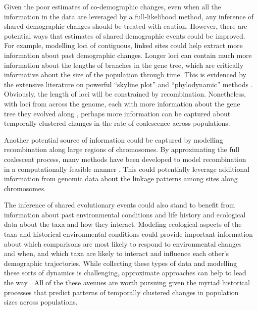Given the poor estimates of co-demographic changes, even when all the
information in the data are leveraged by a full-likelihood method, any
inference of shared demographic changes should be treated with caution.
However, there are potential ways that estimates of shared demographic
events could be improved.
For example, modelling loci of contiguous, linked sites could help
extract more information about past demographic changes.
Longer loci can contain much more information about the lengths of branches in
the gene tree, which are critically informative about the size of the
population through time.
This is evidenced by the extensive literature on powerful 
``skyline plot'' and ``phylodynamic'' methods
\citep{Pybus2000,Strimmer2001,OpgenRhein2005,Drummond2005,Heled2008,Minin2008beast,Ho2011,Palacios2012,Palacios2012UAI,Stadler2013,Gill2013,Palacios2014,Lan2015,Karcher2016,Karcher2017,Faulkner2018,Karcher2019}.
Obviously, the length of loci will be constrained by recombination.
Nonetheless, with loci from across the genome, each with more information about
the gene tree they evolved along \citep{Speidel2019},
perhaps more information can be captured about temporally clustered changes in
the rate of coalescence across populations.

Another potential source of information could be captured by modelling
recombination along large regions of chromosomes.
By approximating the full coalescent process, many methods have been developed
to model recombination in a computationally feasible manner
\citep{McVean2005,Marjoram2006,Chen2009,Li2011,Sheehan2013,Schiffels2014,Rasmussen2014,Palacios2015}.
This could potentially leverage additional information from genomic data about the
linkage patterns among sites along chromosomes.

The inference of shared evolutionary events could also stand to benefit from
information about past environmental conditions and life history and ecological
data about the taxa and how they interact.
Modeling ecological aspects of the taxa and historical environmental conditions
could provide important information about which comparisons are most likely to
respond to environmental changes and when, and which taxa are likely to
interact and influence each other's demographic trajectories.
While collecting these types of data and modelling these sorts of dynamics
is challenging, approximate approaches can help to lead the way
\citep{He2013,Massatti2016,Bemmels2016,Knowles2017,Papadopoulou2016}.
All of the these avenues are worth pursuing given the myriad historical
processes that predict patterns of temporally clustered changes in population
sizes across populations.
